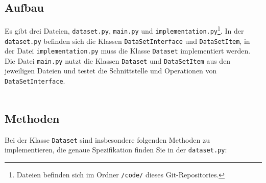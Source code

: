 \documentclass[a4paper]{article}
\begin{document}
\subsection{Aufbau}
Es gibt drei Dateien, \verb|dataset.py|, \verb|main.py| und \verb|implementation.py|\footnote{Dateien befinden sich im Ordner \verb|/code/| dieses Git-Repositories.}.
In der \verb|dataset.py| befinden sich die Klassen \verb|DataSetInterface| und \verb|DataSetItem|,
in der Datei \verb|implementation.py| muss die Klasse \verb|Dataset| implementiert werden.
Die Datei \verb|main.py| nutzt die Klassen \verb|Dataset| und \verb|DataSetItem| aus den jeweiligen Dateien und testet die Schnittstelle und Operationen von \verb|DataSetInterface|.\\
\\

\subsection{Methoden}

Bei der Klasse \verb|Dataset| sind insbesondere folgenden Methoden zu implementieren, die genaue Spezifikation finden Sie in der \verb|dataset.py|:
\end{document}
